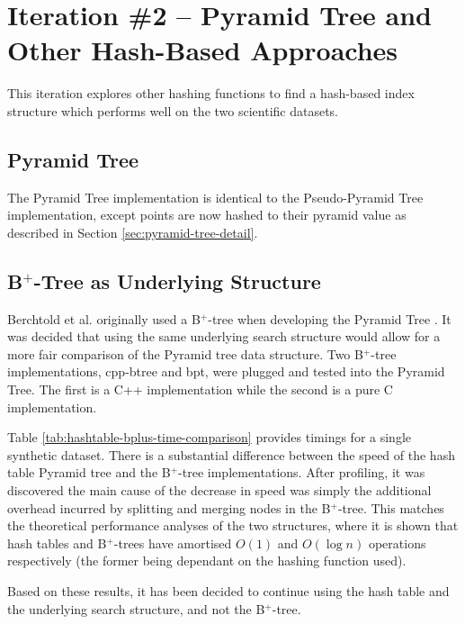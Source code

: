 \section{Iteration \#2 -- Pyramid Tree and Other Hash-Based Approaches}

This iteration explores other hashing functions to find a hash-based index structure which performs well on the two scientific datasets.

\subsection{Pyramid Tree}

The Pyramid Tree implementation is identical to the Pseudo-Pyramid Tree implementation, except points are now hashed to their pyramid value as described in Section \ref{sec:pyramid-tree-detail}.

\subsection{B${}^+$-Tree as Underlying Structure}

Berchtold et al. originally used a B${}^{+}$-tree when developing the Pyramid Tree \cite{pyramid-tree}. It was decided that using the same underlying search structure would allow for a more fair comparison of the Pyramid tree data structure. Two B${}^{+}$-tree implementations, cpp-btree\cite{cpp-btree} and bpt\cite{bpt}, were plugged and tested into the Pyramid Tree. The first is a C++ implementation while the second is a pure C implementation.

Table \ref{tab:hashtable-bplus-time-comparison} provides timings for a single synthetic dataset. There is a substantial difference between the speed of the hash table Pyramid tree and the B${}^{+}$-tree implementations. After profiling, it was discovered the main cause of the decrease in speed was simply the additional overhead incurred by splitting and merging nodes in the B${}^{+}$-tree. This matches the theoretical performance analyses of the two structures, where it is shown that hash tables and B${}^{+}$-trees have amortised $O(1)$ and $O(\log n)$ operations respectively (the former being dependant on the hashing function used).

Based on these results, it has been decided to continue using the hash table and the underlying search structure, and not the B${}^{+}$-tree.

